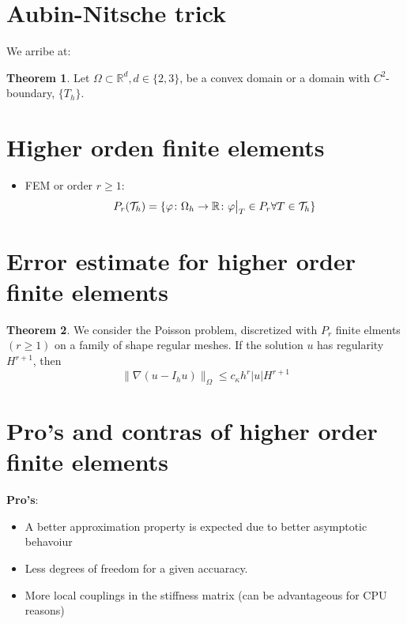 \documentclass[openany,a4paper,11pt]{memoir}
\theoremstyle{definition}
\newtheorem{theorem}{Theorem}
\newcommand\restr[2]{{%
  \left.\kern-\nulldelimiterspace %
  #1 %
  \vphantom{\big|} %
  \right|_{#2} %
  }}
\begin{document}
\section{Aubin-Nitsche trick}
We arribe at:
\begin{theorem}
  Let $\Omega\subset\mathbb{R}^d, d\in\{2,3\}$, be a convex domain or a domain with $C^2$-boundary, $\{T_h\}$.
\end{theorem}

\section{Higher orden finite elements}

\begin{itemize}
\item FEM or order $r\ge1$: \[ P_r(\mathcal{T}_h)=\{\varphi\colon\Omega_h\rightarrow\mathbb{R}\colon \restr{\varphi}{T}\in P_r\forall T\in\mathcal{T}_h \} \]
\end{itemize}

\section{Error estimate for higher order finite elements}

\begin{theorem}
  We consider the Poisson problem, discretized with $P_r$ finite elments $(r\ge 1)$ on a family of shape regular meshes. If the solution $u$ has regularity $H^{r+1}$, then \[ \|\nabla(u-I_h u)\|_{\Omega}\le c_{\kappa}h^r|u|H^{r+1} \] %
\end{theorem}

\section{Pro's  and contras of higher order finite elements}

\textbf{Pro's}:
\begin{itemize}
\item A better approximation property is expected due to better asymptotic behavoiur
  
\item Less degrees of freedom for a given accuaracy.
  
\item More local couplings in the stiffness matrix (can be advantageous for CPU reasons)
 
\end{itemize}
\end{document}

